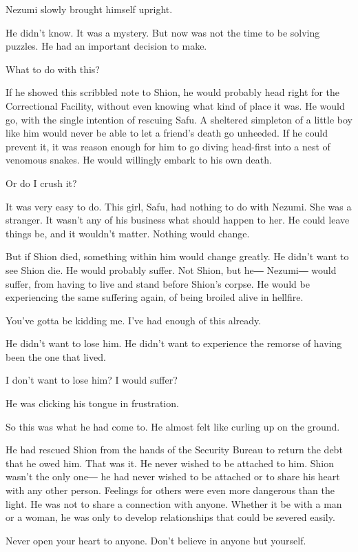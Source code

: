 Nezumi slowly brought himself upright.

He didn't know. It was a mystery. But now was not the time to be solving
puzzles. He had an important decision to make.

What to do with this?

If he showed this scribbled note to Shion, he would probably head right
for the Correctional Facility, without even knowing what kind of place
it was. He would go, with the single intention of rescuing Safu. A
sheltered simpleton of a little boy like him would never be able to let
a friend's death go unheeded. If he could prevent it, it was reason
enough for him to go diving head-first into a nest of venomous snakes.
He would willingly embark to his own death.

Or do I crush it?

It was very easy to do. This girl, Safu, had nothing to do with Nezumi.
She was a stranger. It wasn't any of his business what should happen to
her. He could leave things be, and it wouldn't matter. Nothing would
change.

But if Shion died, something within him would change greatly. He didn't
want to see Shion die. He would probably suffer. Not Shion, but he―
Nezumi― would suffer, from having to live and stand before Shion's
corpse. He would be experiencing the same suffering again, of being
broiled alive in hellfire.

You've gotta be kidding me. I've had enough of this already.

He didn't want to lose him. He didn't want to experience the remorse of
having been the one that lived.

I don't want to lose him? I would suffer?

He was clicking his tongue in frustration.

So this was what he had come to. He almost felt like curling up on the
ground.

He had rescued Shion from the hands of the Security Bureau to return the
debt that he owed him. That was it. He never wished to be attached to
him. Shion wasn't the only one― he had never wished to be attached or to
share his heart with any other person. Feelings for others were even
more dangerous than the light. He was not to share a connection with
anyone. Whether it be with a man or a woman, he was only to develop
relationships that could be severed easily.

Never open your heart to anyone. Don't believe in anyone but yourself.

